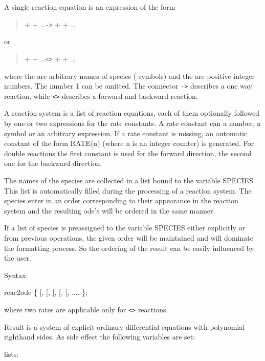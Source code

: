 
A single reaction equation is an expression of the form
\begin{quote}
  +  + \ldots \texttt{->}  +  + \ldots
\end{quote}
 or
\begin{quote}  +  + \ldots \texttt{<>}  +  + \ldots
\end{quote}
where the  are arbitrary names of species (\REDUCE{} symbols)
and the  are positive integer numbers. The number 1
can be omitted. The connector \texttt{->} describes a one way reaction,
while \texttt{<>} describes a forward and backward reaction.

A reaction system is a list of reaction equations, each of them
optionally followed by one or two expressions for the rate
constants. A rate constant can a number, a symbol or an 
arbitrary \REDUCE{} expression. If a rate constant is missing,
an automatic constant of the form RATE(n) (where n is an
integer counter) is generated. For double reactions the
first constant is used for the forward direction, the second
one for the backward direction.

The names of the species are collected in a list bound to
the \REDUCE{} variable SPECIES. This list is automatically filled
during the processing of a reaction system. The species enter
in an order corresponding to their appearance in the reaction
system and the resulting ode's will be ordered in the same manner.

If a list of species is preassigned to the variable
SPECIES either explicitly or from previous operations, the 
given order will be maintained and will dominate the formatting
process. So the ordering of the result can be easily influenced
by the user.

Syntax:

 reac2ode \{  {[}, {[},\meta{rate}{]}{]} 
 {[}, {[}, {[},\meta{rate}{]}{]}{]} 
 .... 
 \};

where two rates are applicable only for \texttt{<>} reactions.

Result is a system of explicit ordinary differential
 equations with polynomial righthand sides. As side
 effect the following variables are set:

 lists:

